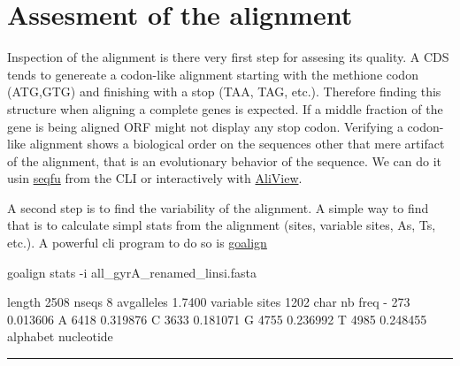 \documentclass[
  letterpaper,
  DIV=11,
  numbers=noendperiod]{scrreprt}
\newenvironment{Shaded}{\begin{snugshade}}{\end{snugshade}}
\newcommand{\AttributeTok}[1]{\textcolor[rgb]{0.40,0.46,0.14}{#1}}
\newcommand{\ExtensionTok}[1]{\textcolor[rgb]{0.00,0.46,0.62}{#1}}
\newcommand{\NormalTok}[1]{\textcolor[rgb]{0.00,0.46,0.62}{#1}}
\begin{document}
\hypertarget{assesment-of-the-alignment}{%
\section*{Assesment of the alignment}\label{assesment-of-the-alignment}}

Inspection of the alignment is there very first step for assesing its
quality. A CDS tends to genereate a codon-like alignment starting with
the methione codon (ATG,GTG) and finishing with a stop (TAA, TAG, etc.).
Therefore finding this structure when aligning a complete genes is
expected. If a middle fraction of the gene is being aligned ORF might
not display any stop codon. Verifying a codon-like alignment shows a
biological order on the sequences other that mere artifact of the
alignment, that is an evolutionary behavior of the sequence. We can do
it usin \href{https://telatin.github.io/seqfu2/}{seqfu} from the CLI or
interactively with \href{https://github.com/AliView/AliView}{AliView}.

A second step is to find the variability of the alignment. A simple way
to find that is to calculate simpl stats from the alignment (sites,
variable sites, As, Ts, etc.). A powerful cli program to do so is
\href{https://github.com/evolbioinfo/goalign}{goalign}

\begin{Shaded}
\begin{Highlighting}[]
\ExtensionTok{goalign}\NormalTok{ stats }\AttributeTok{{-}i}\NormalTok{ all\_gyrA\_renamed\_linsi.fasta}
\end{Highlighting}
\end{Shaded}

\begin{Shaded}
\begin{Highlighting}[]
\ExtensionTok{length}\NormalTok{  2508}
\ExtensionTok{nseqs}\NormalTok{   8}
\ExtensionTok{avgalleles}\NormalTok{  1.7400}
\ExtensionTok{variable}\NormalTok{ sites  1202}
\ExtensionTok{char}\NormalTok{    nb  freq}
\ExtensionTok{{-}}\NormalTok{   273 0.013606}
\ExtensionTok{A}\NormalTok{   6418    0.319876}
\ExtensionTok{C}\NormalTok{   3633    0.181071}
\ExtensionTok{G}\NormalTok{   4755    0.236992}
\ExtensionTok{T}\NormalTok{   4985    0.248455}
\ExtensionTok{alphabet}\NormalTok{    nucleotide}
\end{Highlighting}
\end{Shaded}

\begin{center}\rule{0.5\linewidth}{0.5pt}\end{center}
\end{document}

